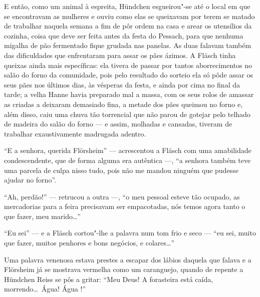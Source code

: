 E então, como um animal à espreita, Hündchen esgueirou"-se até o local
em que se encontravam as mulheres e ouviu como elas se queixavam por
terem se matado de trabalhar naquela semana a fim de pôr ordem na casa
e arear os utensílios da cozinha, coisa que deve ser feita antes da
festa do Pessach, para que nenhuma migalha de pão fermentado fique
grudada nas panelas. As duas falavam também das dificuldades que
enfrentaram para assar os pães ázimos. A Fläsch tinha queixas ainda
mais específicas: ela tivera de passar por tantos aborrecimentos no
salão do forno da comunidade, pois pelo resultado do sorteio ela só
pôde assar os seus pães nos últimos dias, às vésperas da festa, e ainda
por cima no final da tarde; a velha Hanne havia preparado mal a massa,
com os seus rolos de amassar as criadas a deixaram demasiado fina, a
metade dos pães queimou no forno e, além disso, caiu uma chuva tão
torrencial que não parou de gotejar pelo telhado de madeira do salão do
forno --- e assim, molhadas e cansadas, tiveram de trabalhar
exaustivamente madrugada adentro.

``E a senhora, querida Flörsheim'' --- acrescentou a Fläsch com uma
amabilidade condescendente, que de forma alguma era autêntica ---, ``a
senhora também teve uma parcela de culpa nisso tudo, pois não me mandou
ninguém que pudesse ajudar no forno''.

``Ah, perdão!'' --- retrucou a outra ---, ``o meu pessoal esteve tão ocupado,
as mercadorias para a feira precisavam ser empacotadas, nós temos agora
tanto o que fazer, meu marido\ldots''

``Eu sei'' --- e a Fläsch cortou"-lhe a palavra num tom frio e seco --- ``eu
sei, muito que fazer, muitos penhores e bons negócios, e colares\ldots''

Uma palavra venenosa estava prestes a escapar dos lábios daquela que
falava e a Flörsheim já se mostrava vermelha como um caranguejo, quando
de repente a Hündchen Reiss se pôs a gritar: ``Meu Deus! A forasteira
está caída, morrendo\ldots\ Água! Água !''

